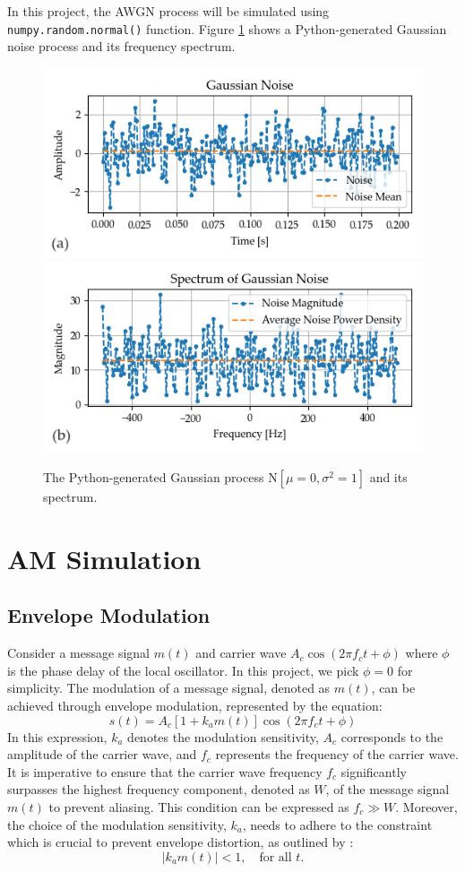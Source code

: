 \documentclass[../ECE459FinalProjectReport.tex]{subfiles}
\begin{document}
In this project, the AWGN process will be simulated using \verb|numpy.random.normal()| function. Figure \ref{fig:gaussian-noise} shows a Python-generated Gaussian noise process and its frequency spectrum.
\begin{figure}[tb]
        \centering
        \includegraphics[width=0.6\linewidth]{plots/gaussian_noise.png}
        \includegraphics[width=0.6\linewidth]{plots/gaussian_noise_spectrum.png}
        \caption{The Python-generated Gaussian process $\mathrm{N}\left[\mu = 0, \sigma^2 = 1\right]$ and its spectrum.}
        \label{fig:gaussian-noise}
\end{figure}


\section{AM Simulation}
\subsection{Envelope Modulation}
Consider a message signal $m\left(t\right)$ and carrier wave $A_c \cos\left(2\pi f_c t + \phi\right)$ where $\phi$ is the phase delay of the local oscillator. In this project, we pick $\phi = 0$ for simplicity. The modulation of a message signal, denoted as $m\left(t\right)$, can be achieved through envelope modulation, represented by the equation:
\begin{equation}
    s\left(t\right) = A_c \left[1 + k_a m\left(t\right)\right] \cos \left(2\pi f_c t + \phi\right)
\end{equation}
In this expression, $k_a$ denotes the modulation sensitivity, $A_c$ corresponds to the amplitude of the carrier wave, and $f_c$ represents the frequency of the carrier wave. It is imperative to ensure that the carrier wave frequency $f_c$ significantly surpasses the highest frequency component, denoted as $W$, of the message signal $m\left(t\right)$ to prevent aliasing. This condition can be expressed as $f_c \gg W$. Moreover, the choice of the modulation sensitivity, $k_a$, needs to adhere to the constraint which is crucial to prevent envelope distortion, as outlined by \textcite[pp. 101--102]{haykinIntroductionAnalogDigital2007}:
\begin{equation}
    \left| k_a m\left(t\right) \right| < 1, \quad \text{for all }t.
\end{equation}
\end{document}
